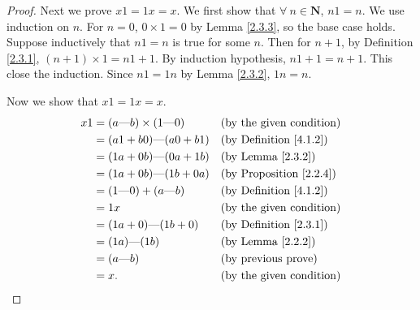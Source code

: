 \begin{proof}
    Next we prove \(x1 = 1x = x\).
    We first show that \(\forall\ n \in \mathbf{N}\), \(n1 = n\).
    We use induction on \(n\).
    For \(n=0\), \(0 \times 1 = 0\) by Lemma \ref{2.3.3}, so the base case holds.
    Suppose inductively that \(n1 = n\) is true for some \(n\).
    Then for \(n + 1\), by Definition \ref{2.3.1}, \((n + 1) \times 1 = n1 + 1\).
    By induction hypothesis, \(n1 + 1 = n + 1\).
    This close the induction.
    Since \(n1 = 1n\) by Lemma \ref{2.3.2}, \(1n = n\).

    Now we show that \(x1 = 1x = x\).
    \begin{align*}
        x1 & = (a \text{---} b) \times (1 \text{---} 0) &  & \text{(by the given condition)}     \\
           & = (a1 + b0) \text{---} (a0 + b1)           &  & \text{(by Definition \ref{4.1.2})}  \\
           & = (1a + 0b) \text{---} (0a + 1b)           &  & \text{(by Lemma \ref{2.3.2})}       \\
           & = (1a + 0b) \text{---} (1b + 0a)           &  & \text{(by Proposition \ref{2.2.4})} \\
           & = (1 \text{---} 0) + (a \text{---} b)      &  & \text{(by Definition \ref{4.1.2})}  \\
           & = 1x                                       &  & \text{(by the given condition)}     \\
           & = (1a + 0) \text{---} (1b + 0)             &  & \text{(by Definition \ref{2.3.1})}  \\
           & = (1a) \text{---} (1b)                     &  & \text{(by Lemma \ref{2.2.2})}       \\
           & = (a \text{---} b)                         &  & \text{(by previous prove)}          \\
           & = x.                                       &  & \text{(by the given condition)}
    \end{align*}


\end{proof}
